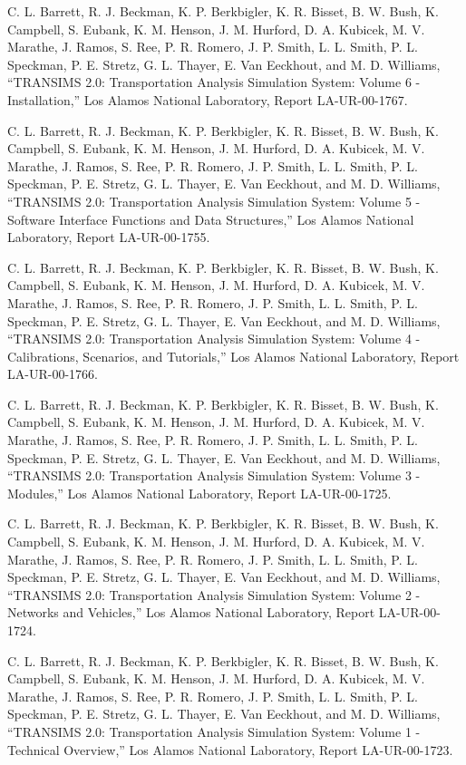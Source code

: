 \documentclass[]{article}
\begin{document}
C. L. Barrett, R. J. Beckman, K. P. Berkbigler, K. R. Bisset, B. W.
Bush, K. Campbell, S. Eubank, K. M. Henson, J. M. Hurford, D. A.
Kubicek, M. V. Marathe, J. Ramos, S. Ree, P. R. Romero, J. P. Smith, L.
L. Smith, P. L. Speckman, P. E. Stretz, G. L. Thayer, E. Van Eeckhout,
and M. D. Williams, ``TRANSIMS 2.0: Transportation Analysis Simulation
System: Volume 6 - Installation,'' Los Alamos National Laboratory,
Report LA-UR-00-1767.

C. L. Barrett, R. J. Beckman, K. P. Berkbigler, K. R. Bisset, B. W.
Bush, K. Campbell, S. Eubank, K. M. Henson, J. M. Hurford, D. A.
Kubicek, M. V. Marathe, J. Ramos, S. Ree, P. R. Romero, J. P. Smith, L.
L. Smith, P. L. Speckman, P. E. Stretz, G. L. Thayer, E. Van Eeckhout,
and M. D. Williams, ``TRANSIMS 2.0: Transportation Analysis Simulation
System: Volume 5 - Software Interface Functions and Data Structures,''
Los Alamos National Laboratory, Report LA-UR-00-1755.

C. L. Barrett, R. J. Beckman, K. P. Berkbigler, K. R. Bisset, B. W.
Bush, K. Campbell, S. Eubank, K. M. Henson, J. M. Hurford, D. A.
Kubicek, M. V. Marathe, J. Ramos, S. Ree, P. R. Romero, J. P. Smith, L.
L. Smith, P. L. Speckman, P. E. Stretz, G. L. Thayer, E. Van Eeckhout,
and M. D. Williams, ``TRANSIMS 2.0: Transportation Analysis Simulation
System: Volume 4 - Calibrations, Scenarios, and Tutorials,'' Los Alamos
National Laboratory, Report LA-UR-00-1766.

C. L. Barrett, R. J. Beckman, K. P. Berkbigler, K. R. Bisset, B. W.
Bush, K. Campbell, S. Eubank, K. M. Henson, J. M. Hurford, D. A.
Kubicek, M. V. Marathe, J. Ramos, S. Ree, P. R. Romero, J. P. Smith, L.
L. Smith, P. L. Speckman, P. E. Stretz, G. L. Thayer, E. Van Eeckhout,
and M. D. Williams, ``TRANSIMS 2.0: Transportation Analysis Simulation
System: Volume 3 - Modules,'' Los Alamos National Laboratory, Report
LA-UR-00-1725.

C. L. Barrett, R. J. Beckman, K. P. Berkbigler, K. R. Bisset, B. W.
Bush, K. Campbell, S. Eubank, K. M. Henson, J. M. Hurford, D. A.
Kubicek, M. V. Marathe, J. Ramos, S. Ree, P. R. Romero, J. P. Smith, L.
L. Smith, P. L. Speckman, P. E. Stretz, G. L. Thayer, E. Van Eeckhout,
and M. D. Williams, ``TRANSIMS 2.0: Transportation Analysis Simulation
System: Volume 2 - Networks and Vehicles,'' Los Alamos National
Laboratory, Report LA-UR-00-1724.

C. L. Barrett, R. J. Beckman, K. P. Berkbigler, K. R. Bisset, B. W.
Bush, K. Campbell, S. Eubank, K. M. Henson, J. M. Hurford, D. A.
Kubicek, M. V. Marathe, J. Ramos, S. Ree, P. R. Romero, J. P. Smith, L.
L. Smith, P. L. Speckman, P. E. Stretz, G. L. Thayer, E. Van Eeckhout,
and M. D. Williams, ``TRANSIMS 2.0: Transportation Analysis Simulation
System: Volume 1 - Technical Overview,'' Los Alamos National Laboratory,
Report LA-UR-00-1723.
\end{document}
